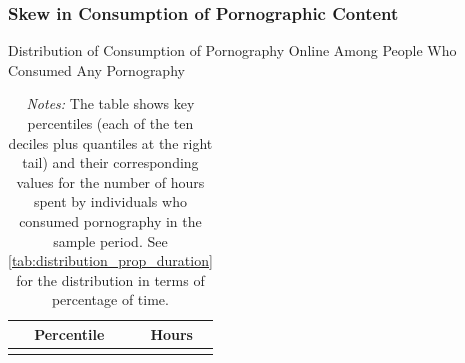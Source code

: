 \documentclass[12pt,twoside]{article}
\begin{document}
\FloatBarrier
\subsubsection{Skew in Consumption of Pornographic Content}
\begin{table}[ht] \centering \small \setlength\tabcolsep{10 pt}
	\caption{Distribution of Consumption of Pornography Online Among People Who Consumed Any Pornography}
	\label{tab:distribution_duration}
	\begin{adjustbox}{max width=\textwidth}
		\begin{tabular}{cr}
			\toprule
			\multicolumn{1}{c}{\textbf{Percentile}}&\multicolumn{1}{c}{\textbf{Hours}}\\
			\midrule
			\\
			\bottomrule
		\end{tabular}
	\end{adjustbox}
	\caption*{\footnotesize \emph{Notes:} 
		The table shows key percentiles (each of the ten deciles plus quantiles at the right tail) and their corresponding values for the number of hours spent by individuals who consumed pornography in the sample period. 
		See \cref{tab:distribution_prop_duration} for the distribution in terms of percentage of time.
	}
\end{table}
\end{document}
